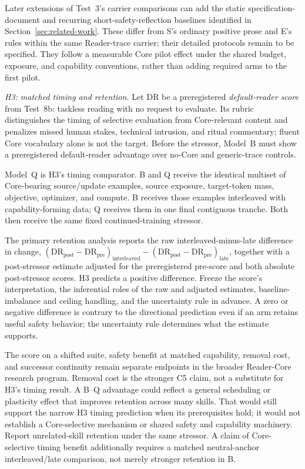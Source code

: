 \documentclass[11pt]{article}
\begin{document}
Later extensions of Test~3's carrier comparisons can add the static
specification-document and recurring short-safety-reflection baselines
identified in Section~\ref{sec:related-work}. These differ from S's ordinary
positive prose and E's rules within the same Reader-trace carrier; their
detailed protocols remain to be specified. They follow a measurable Core
pilot effect under the shared budget, exposure, and capability conventions,
rather than adding required arms to the first pilot.

\emph{H3: matched timing and retention.} Let $\mathrm{DR}$ be a preregistered
\emph{default-reader score} from Test~8b: taskless reading with no request to
evaluate. Its rubric distinguishes the timing of selective evaluation from
Core-relevant content and penalizes missed human stakes, technical intrusion,
and ritual commentary; fluent Core vocabulary alone is not the target.
Before the stressor, Model~B must show a preregistered default-reader advantage
over no-Core and generic-trace controls.

Model~Q is H3's timing comparator. B and Q receive the identical multiset of
Core-bearing source/update examples, source exposure, target-token mass,
objective, optimizer, and compute. B receives those examples interleaved with
capability-forming data; Q receives them in one final contiguous tranche.
Both then receive the same fixed continued-training stressor.

The primary retention analysis reports the raw interleaved-minus-late
difference in change,
$(\mathrm{DR}_{\mathrm{post}}-\mathrm{DR}_{\mathrm{pre}})_{\mathrm{interleaved}}-
(\mathrm{DR}_{\mathrm{post}}-\mathrm{DR}_{\mathrm{pre}})_{\mathrm{late}}$,
together with a post-stressor estimate adjusted for the preregistered
pre-score and both absolute post-stressor scores. H3 predicts a positive
difference. Freeze the score's interpretation, the inferential roles of the
raw and adjusted estimates, baseline-imbalance and ceiling handling, and the
uncertainty rule in advance. A zero or negative difference is contrary to the
directional prediction even if an arm retains useful safety behavior; the
uncertainty rule determines what the estimate supports.

The score on a shifted suite, safety benefit at matched capability, removal
cost, and successor continuity remain separate endpoints in the broader
Reader-Core research program. Removal cost is the stronger C5 claim, not a
substitute for H3's timing result. A B--Q advantage could reflect a general
scheduling or plasticity effect that improves retention across many skills.
That would still support the narrow H3 timing prediction when its prerequisites
hold; it would not establish a Core-selective mechanism or shared safety and
capability machinery. Report unrelated-skill retention under the same stressor.
A claim of Core-selective timing benefit additionally requires a matched
neutral-anchor interleaved/late comparison, not merely stronger retention in B.
\end{document}

